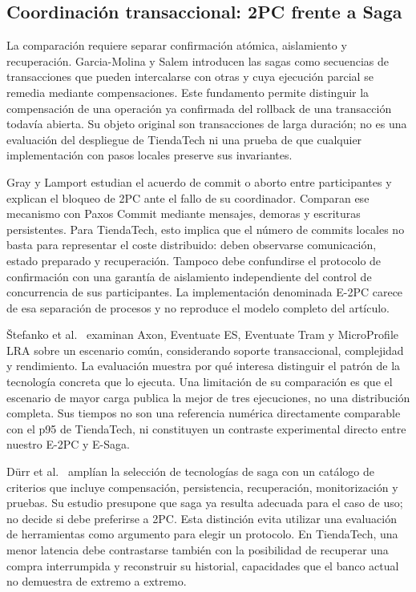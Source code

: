 \subsection{Coordinación transaccional: 2PC frente a Saga}\label{sec:literatura-coordinacion}
La comparación requiere separar confirmación atómica, aislamiento y recuperación. Garcia-Molina y Salem \cite{garciamolina1987sagas} introducen las sagas como secuencias de transacciones que pueden intercalarse con otras y cuya ejecución parcial se remedia mediante compensaciones. Este fundamento permite distinguir la compensación de una operación ya confirmada del rollback de una transacción todavía abierta. Su objeto original son transacciones de larga duración; no es una evaluación del despliegue de TiendaTech ni una prueba de que cualquier implementación con pasos locales preserve sus invariantes.

Gray y Lamport \cite{gray2006commit} estudian el acuerdo de commit o aborto entre participantes y explican el bloqueo de 2PC ante el fallo de su coordinador. Comparan ese mecanismo con Paxos Commit mediante mensajes, demoras y escrituras persistentes. Para TiendaTech, esto implica que el número de commits locales no basta para representar el coste distribuido: deben observarse comunicación, estado preparado y recuperación. Tampoco debe confundirse el protocolo de confirmación con una garantía de aislamiento independiente del control de concurrencia de sus participantes. La implementación denominada E-2PC carece de esa separación de procesos y no reproduce el modelo completo del artículo.

Štefanko et al.\ \cite{stefanko2019saga} examinan Axon, Eventuate ES, Eventuate Tram y MicroProfile LRA sobre un escenario común, considerando soporte transaccional, complejidad y rendimiento. La evaluación muestra por qué interesa distinguir el patrón de la tecnología concreta que lo ejecuta. Una limitación de su comparación es que el escenario de mayor carga publica la mejor de tres ejecuciones, no una distribución completa. Sus tiempos no son una referencia numérica directamente comparable con el p95 de TiendaTech, ni constituyen un contraste experimental directo entre nuestro E-2PC y E-Saga.

Dürr et al.\ \cite{durr2022saga} amplían la selección de tecnologías de saga con un catálogo de criterios que incluye compensación, persistencia, recuperación, monitorización y pruebas. Su estudio presupone que saga ya resulta adecuada para el caso de uso; no decide si debe preferirse a 2PC. Esta distinción evita utilizar una evaluación de herramientas como argumento para elegir un protocolo. En TiendaTech, una menor latencia debe contrastarse también con la posibilidad de recuperar una compra interrumpida y reconstruir su historial, capacidades que el banco actual no demuestra de extremo a extremo.

